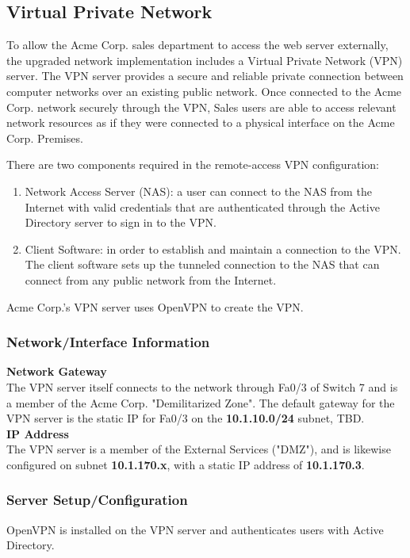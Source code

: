 \subsection{Virtual Private Network}
To allow the Acme Corp. sales department to access the web server 
externally, the upgraded network implementation includes a Virtual Private 
Network (VPN) server. The VPN server provides a secure and reliable private 
connection between computer networks over an existing public network. Once
connected to the Acme Corp. network securely through the VPN, Sales users are
able to access relevant network resources as if they were connected to a
physical interface on the Acme Corp. Premises.

\noindent
There are two components required in the remote-access VPN configuration:
\begin{enumerate}
    \item Network Access Server (NAS): a user can connect to the NAS from the
		Internet with valid credentials that are authenticated through the
        Active Directory server to sign in to the VPN.
	\item Client Software: in order to establish and maintain a connection
		to the VPN. The client software sets up the tunneled connection to the 
        NAS that can connect from any public network from the Internet. 
\end{enumerate}

\noindent
Acme Corp.'s VPN server uses OpenVPN to create the VPN.
\subsubsection{Network/Interface Information}
\textbf{Network Gateway} \\
The VPN server itself connects to the network through Fa0/3 of Switch 7 and is 
a member of the Acme Corp. "Demilitarized Zone". The default gateway for the VPN 
server is the static IP for Fa0/3 on the \textbf{10.1.10.0/24} subnet, TBD. \\

\noindent
\textbf{IP Address} \\
The VPN server is a member of the External Services ("DMZ"), and is
likewise configured on subnet \textbf{10.1.170.x}, with a static IP address of 
\textbf{10.1.170.3}. \\

\subsubsection{Server Setup/Configuration}
OpenVPN is installed on the VPN server and authenticates users with Active
Directory.

